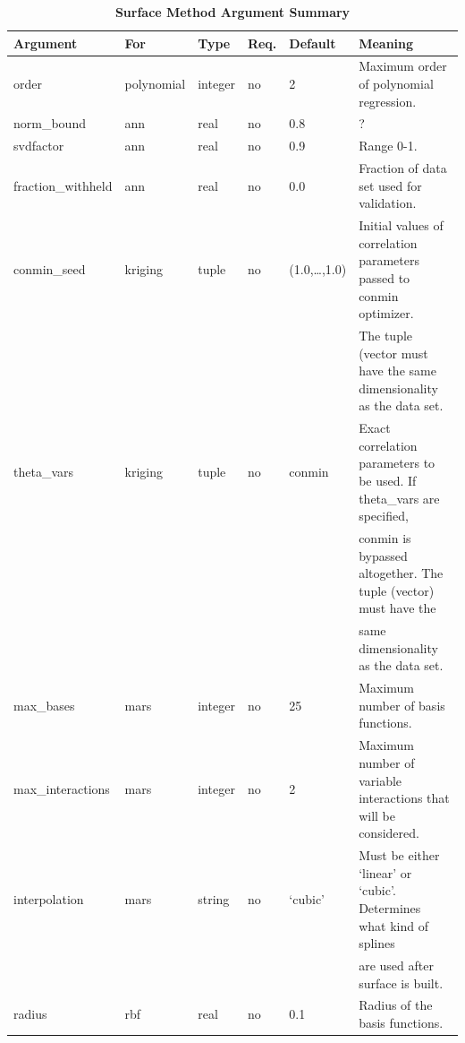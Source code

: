 \documentclass{article}
\begin{document}
\begin{table}
  \centering
  \begin{tabular}{|l|l|l|l|l|l|}
    \hline
    \textbf{Argument} & \textbf{For} & \textbf{Type} & \textbf{Req.} &
    \textbf{Default} & \textbf{Meaning}\\
    \hline
    order & polynomial & integer & no & 2 & Maximum order of
    polynomial regression.\\
    \hline
    norm\_bound & ann & real & no & 0.8 & ?\\
    \hline
    svdfactor & ann & real & no & 0.9 & Range 0-1.\\
    \hline
    fraction\_withheld & ann & real & no & 0.0 & Fraction of data set
    used for validation.\\
    \hline
    conmin\_seed & kriging & tuple & no & (1.0,\ldots,1.0) & Initial
    values of correlation parameters passed to conmin optimizer.\\
    & & & & & The tuple (vector must have the same dimensionality as
    the data set.\\
    \hline
    theta\_vars & kriging & tuple & no & conmin & Exact correlation
    parameters to be used.  If theta\_vars are specified,\\
    & & & & & conmin is bypassed altogether.  The tuple (vector)
    must have the\\
    & & & & & same dimensionality as the data set.\\
    \hline
    max\_bases & mars & integer & no & 25 & Maximum number of basis
    functions.\\
    \hline
    max\_interactions & mars & integer & no & 2 & Maximum number of
    variable interactions that will be considered.\\
    \hline
    interpolation & mars & string & no & `cubic' & Must be either
    `linear' or `cubic'.  Determines what kind of splines\\
    & & & & & are used after surface is built.\\
    \hline
    radius & rbf & real & no & 0.1 & Radius of the basis
    functions.\\
    \hline
  \end{tabular}
  \caption{\textbf{Surface Method Argument Summary}}
\end{table}
\end{document}
